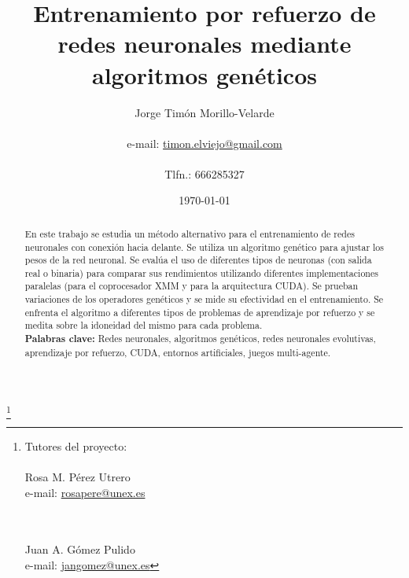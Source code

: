 \documentclass[a4paper,11pt]{article}
\makeatletter
\newcommand{\mail}[1][timon.elviejo@gmail.com]{%
e-mail: \href{mailto:#1} {#1}
}
\makeatother
\begin{document}


\begin{titlepage}

\title{Entrenamiento por refuerzo de redes neuronales mediante algoritmos gen\'eticos}

\author{Jorge Tim\'on Morillo-Velarde \\ 
		\\ \mail
		\\ Tlfn.: 666285327}

\date{\today}

\thanks{Tutores del proyecto:\\ \\ Rosa M. P\'erez Utrero \\ \mail[rosapere@unex.es]
		\\ \\ Juan A. G\'omez Pulido \\ \mail[jangomez@unex.es]}

\maketitle


 \end{titlepage}



\begin{abstract}

En este trabajo se estudia un m\'etodo alternativo para el entrenamiento de redes neuronales con conexi\'on hacia delante. Se utiliza un algoritmo gen\'etico para ajustar los pesos de la red neuronal. Se eval\'ua el uso de diferentes tipos de neuronas (con salida real o binaria) para comparar sus rendimientos utilizando diferentes implementaciones paralelas (para el coprocesador XMM y para la arquitectura CUDA). Se prueban variaciones de los operadores gen\'eticos y se mide su efectividad en el entrenamiento. Se enfrenta el algoritmo a diferentes tipos de problemas de aprendizaje por refuerzo y se medita sobre la idoneidad del mismo para cada problema.
\\

\textbf{Palabras clave:} Redes neuronales, algoritmos gen\'eticos, redes neuronales evolutivas, aprendizaje por refuerzo, CUDA, entornos artificiales, juegos multi-agente.

\end{abstract}
\end{document}
